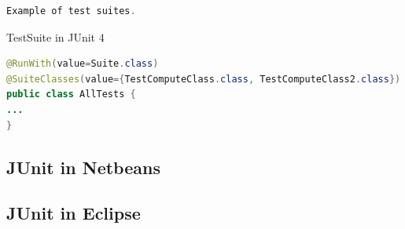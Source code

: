 \documentclass[11pt, xcolor=svgnames]{beamer}
\begin{document}
\begin{frame}[fragile]

\begin{lstlisting}[language=JAVA,basicstyle=\scriptsize]
Example of test suites.
\end{lstlisting}

\end{frame}

\begin{frame}[fragile]{TestSuite in JUnit 4}


\begin{lstlisting}[language=JAVA,basicstyle=\scriptsize]
@RunWith(value=Suite.class)
@SuiteClasses(value={TestComputeClass.class, TestComputeClass2.class})
public class AllTests {
...
}
\end{lstlisting}
\end{frame}







\subsection{JUnit in Netbeans}





\subsection{JUnit in Eclipse}


%
%  
%  
%  
%
\end{document}
